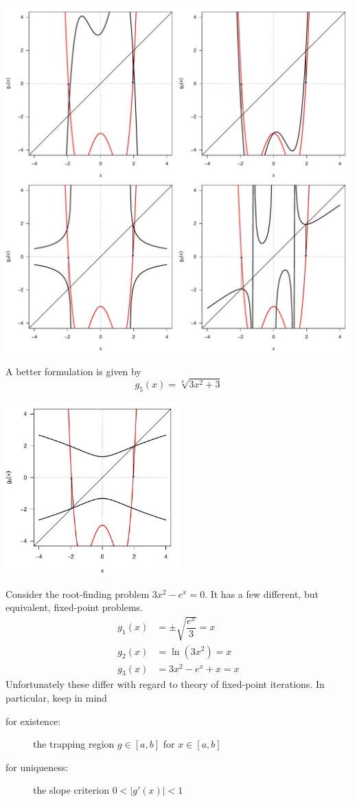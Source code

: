\documentclass[11pt]{article}
\begin{document}
\begin{center}
\includegraphics[width=\textwidth]{1_basics/bad.pdf}
\end{center}

\newpage
A better formulation is given by \[g_5(x) = \sqrt[4]{3x^2+3}\]

\begin{center}
\includegraphics[width=0.5\textwidth]{1_basics/good.pdf}
\end{center}

Consider the root-finding problem \(3x^2-e^x = 0\). It has a few different, but equivalent, fixed-point problems.
\begin{align}
g_1(x) & = \pm\sqrt{\dfrac{e^x}{3}} = x\\
g_2(x) & = \ln(3x^2) = x\\
g_3(x) & = 3x^2 - e^x + x = x
\end{align}
Unfortunately these differ with regard to theory of fixed-point iterations. In particular, keep in mind
\begin{description}
\item[for existence:] the trapping region \(g\in[a,b]\) for \(x\in[a,b]\)
\item[for uniqueness:] the slope criterion \(0<|g'(x)|<1\)
\end{description}
\end{document}
